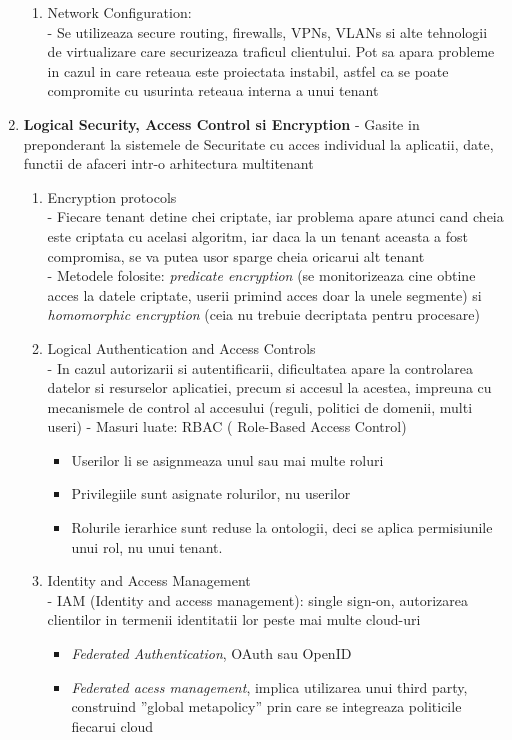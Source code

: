 \documentclass[twoside,twocolumn]{article}
\begin{document}
\begin{enumerate}
\begin{enumerate}
\item  Network Configuration: \\
- Se utilizeaza secure routing, firewalls, VPNs, VLANs si alte tehnologii de virtualizare care securizeaza traficul clientului. Pot sa apara probleme in cazul in care reteaua este proiectata instabil, astfel ca se poate compromite cu usurinta reteaua interna a unui tenant\\
\end{enumerate}

\item \textbf{Logical Security, Access Control si Encryption}
- Gasite in preponderant la sistemele de Securitate cu acces individual la aplicatii, date, functii de afaceri intr-o arhitectura multitenant\\
\begin{enumerate}
\item 	Encryption protocols\\
-	Fiecare tenant detine chei criptate, iar problema apare atunci cand cheia este criptata cu acelasi algoritm, iar daca la un tenant aceasta a fost compromisa, se va putea usor sparge cheia oricarui alt tenant\\
-   Metodele folosite: \textit{predicate encryption} (se monitorizeaza cine obtine acces la datele criptate, userii primind acces doar la unele segmente) si \textit{homomorphic encryption} (ceia nu trebuie decriptata pentru procesare) \\

\item 	Logical Authentication and Access Controls\\
- In cazul autorizarii si autentificarii, dificultatea apare la controlarea datelor si resurselor aplicatiei, precum si accesul la acestea, impreuna cu mecanismele de control al accesului (reguli, politici de domenii, multi useri)
- Masuri luate: RBAC ( Role-Based Access Control)
\begin{itemize}
    \item Userilor li se asignmeaza unul sau mai multe roluri
    \item Privilegiile sunt asignate rolurilor, nu userilor
    \item Rolurile  ierarhice sunt reduse la ontologii, deci se aplica permisiunile unui rol, nu unui tenant.
\end{itemize}

\item 	Identity and Access Management\\
-  IAM (Identity and access management):  single sign-on, autorizarea clientilor in termenii identitatii lor peste mai multe cloud-uri\\
\begin{itemize}
    \item \textit{Federated Authentication}, OAuth sau OpenID
    \item \textit{Federated acess management},  implica utilizarea unui third party, construind ''global metapolicy'' prin care se integreaza politicile fiecarui cloud\\
\end{itemize}


\end{enumerate}
\end{enumerate}
\end{document}
